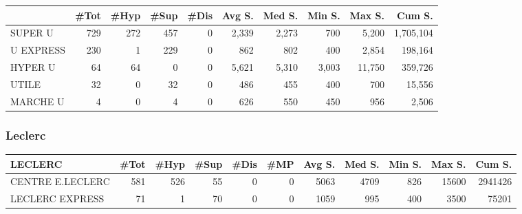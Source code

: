 \documentclass[11pt]{article}
\begin{document}
\begin{table}[H]
\footnotesize
\setlength{\tabcolsep}{2pt}

\begin{tabular}{lrrrrrrrrr}
\toprule
\toprule
{} &       \#Tot &       \#Hyp &       \#Sup &       \#Dis &     Avg S. &     Med S. &     Min S. &     Max S. &     Cum S. \\
\midrule
SUPER U   &        729 &        272 &        457 &          0 &      2,339 &      2,273 &        700 &      5,200 &  1,705,104 \\
U EXPRESS &        230 &          1 &        229 &          0 &        862 &        802 &        400 &      2,854 &    198,164 \\
HYPER U   &         64 &         64 &          0 &          0 &      5,621 &      5,310 &      3,003 &     11,750 &    359,726 \\
UTILE     &         32 &          0 &         32 &          0 &        486 &        455 &        400 &        700 &     15,556 \\
MARCHE U  &          4 &          0 &          4 &          0 &        626 &        550 &        450 &        956 &      2,506 \\
\bottomrule
\end{tabular}

\end{table}


\subsubsection{Leclerc}

\begin{table}[H]
\footnotesize
\setlength{\tabcolsep}{2pt}

\begin{tabular}{lrrrrrrrrrr}
\toprule
\toprule
LECLERC &       \#Tot &       \#Hyp &       \#Sup &       \#Dis &        \#MP &     Avg S. &     Med S. &     Min S. &     Max S. &     Cum S. \\
\midrule
CENTRE E.LECLERC &        581 &        526 &         55 &          0 &          0 &       5063 &       4709 &        826 &      15600 &    2941426 \\
LECLERC EXPRESS  &         71 &          1 &         70 &          0 &          0 &       1059 &        995 &        400 &       3500 &      75201 \\
\bottomrule
\end{tabular}

\end{table}
\end{document}
